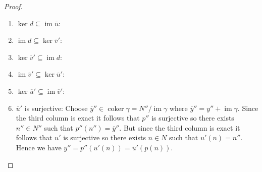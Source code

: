 \documentclass[8pt]{amsart}
\theoremstyle{plain}%
\theoremstyle{definition}
\theoremstyle{remark}
\numberwithin{equation}{section}
\newcommand{\im}{\operatorname{im}}
\newcommand{\coker}{\operatorname{coker}}
\begin{document}
\begin{proof}
\begin{enumerate}
		\item $\ker d \subseteq \im \overline u$:
		\item $\im d \subseteq \ker \overline v'$:
		\item $\ker \overline v' \subseteq \im d$:
		\item $\im \overline v' \subseteq \ker \overline u'$:
		\item $\ker \overline u' \subseteq \im \overline v'$:

		\item $\overline u'$ is surjective: Choose $\overline y'' \in \coker \gamma = N''/\im \gamma$ where $\overline y'' = y'' + \im \gamma$. Since the third column is exact it follows that $p''$ is surjective so there exists $n'' \in N''$ such that $p''(n'') = \overline y''$. But since the third column is exact it follows that $u'$ is surjective so there exists $n \in N$ such that $u'(n) = n''$. Hence we have $y'' = p''(u'(n)) = \overline u'(p(n))$.
	\end{enumerate}


	\end{proof}
\end{document}
